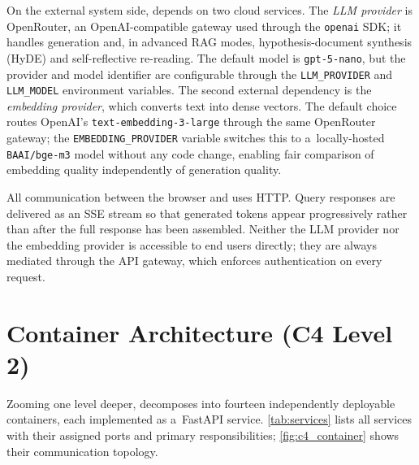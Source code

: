 On the external system side, \medrag{} depends on two cloud services.
The \emph{LLM provider} is OpenRouter, an OpenAI-compatible gateway used
through the \texttt{openai} SDK; it handles generation and, in advanced RAG
modes, hypothesis-document synthesis (HyDE) and self-reflective re-reading.
The default model is \texttt{gpt-5-nano},
but the provider and model identifier are configurable through the
\texttt{LLM\_PROVIDER} and \texttt{LLM\_MODEL} environment variables.
The second external dependency is the \emph{embedding provider}, which
converts text into dense vectors.  The default choice routes OpenAI's
\texttt{text-embedding-3-large} through the same OpenRouter gateway;
the \texttt{EMBEDDING\_PROVIDER} variable switches this to a~locally-hosted
\texttt{BAAI/bge-m3} model without any code change, enabling fair comparison of
embedding quality independently of generation quality.

All communication between the browser and \medrag{} uses HTTP.  Query
responses are delivered as an SSE stream so that generated tokens appear
progressively rather than after the full response has been assembled.
Neither the LLM provider nor the embedding provider is accessible to
end users directly; they are always mediated through the \medrag{} API
gateway, which enforces authentication on every request.

\section{Container Architecture (C4 Level 2)}
\label{sec:c4_container}

Zooming one level deeper, \medrag{} decomposes into fourteen independently
deployable containers, each implemented as a~FastAPI service.
\cref{tab:services} lists all services with their assigned ports and primary
responsibilities; \cref{fig:c4_container} shows their communication topology.

